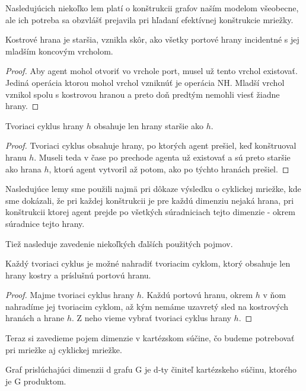 Nasledujúcich niekoľko lem platí o konštrukcii grafov naším modelom
všeobecne, ale ich potreba sa obzvlášť prejavila pri hľadaní efektívnej
konštrukcie mriežky.

\begin{lem}
Kostrové hrana je staršia, vznikla skôr, ako všetky portové hrany incidentné
s jej mladším koncovým vrcholom.
\end{lem}
\begin{proof}
Aby agent mohol otvoriť vo vrchole port, musel už tento vrchol existovať.
Jediná operácia ktorou mohol vrchol vzniknúť je operácia NH. Mladší vrchol
vznikol spolu s kostrovou hranou a preto doň predtým nemohli viesť žiadne
hrany.
\end{proof}


\begin{lem}
Tvoriaci cyklus hrany $h$ obsahuje len hrany staršie ako $h$.
\end{lem}
\begin{proof}
Tvoriaci cyklus obsahuje hrany, po ktorých agent prešiel, keď konštruoval
hranu $h$. Museli teda v čase po prechode agenta už existovať a sú preto 
staršie ako hrana $h$, ktorú agent vytvoril až potom, ako po týchto hranách
prešiel.
\end{proof}

Nasledujúce lemy sme použili najmä pri dôkaze výsledku o cyklickej mriežke,
kde sme dokázali, že pri každej konštrukcii je pre každú dimenziu nejaká
hrana, pri konštrukcii ktorej agent prejde po všetkých súradniciach tejto
dimenzie - okrem súradnice tejto hrany.

Tiež nasleduje zavedenie niekoľkých ďalších použitých pojmov.

\begin{lem}
\label{cyklus}
Každý tvoriaci cyklus je možné nahradiť tvoriacim cyklom, ktorý obsahuje len
hrany kostry a príslušnú portovú hranu.
\end{lem}
\begin{proof}
Majme tvoriaci cyklus hrany $h$. Každú portovú hranu, okrem $h$  v ňom nahradíme 
jej tvoriacim
cyklom, až kým nemáme uzavretý sled na kostrových hranách a hrane $h$. Z
neho vieme vybrať tvoriaci cyklus hrany $h$.
\end{proof}


Teraz si zavedieme pojem dimenzie v kartézskom súčine, čo budeme potrebovať
pri mriežke aj cyklickej mriežke.

\begin{ozn}
Graf prislúchajúci dimenzii d grafu G je d-ty činiteľ kartézskeho súčinu, 
ktorého je G produktom.
\end{ozn}

